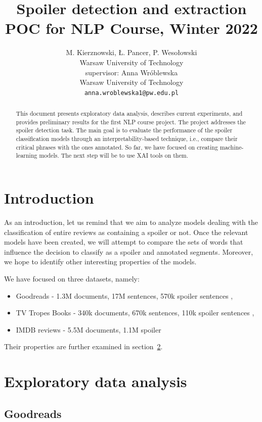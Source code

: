 \documentclass[11pt]{article}
\title{Spoiler detection and extraction\\POC for NLP Course, Winter 2022}
\author{M. Kierznowski, Ł. Pancer, P. Wesołowski \\
  Warsaw University of Technology \\
  \And
    supervisor: Anna Wróblewska \\
  Warsaw University of Technology \\
    {\tt anna.wroblewska1@pw.edu.pl}
    }
\date{}
\begin{document}
\maketitle
\begin{abstract}
This document presents exploratory data analysis, describes current experiments, and provides preliminary results for the first NLP course project. The project addresses the spoiler detection task. The main goal is to evaluate the performance of the spoiler classification models through an interpretability-based technique, i.e., compare their critical phrases with the ones annotated. So far, we have focused on creating machine-learning models. The next step will be to use XAI tools on them.

\end{abstract}

\section{Introduction}
As an introduction, let us remind that we aim to analyze models dealing with the classification of entire reviews as containing a spoiler or not. Once the relevant models have been created, we will attempt to compare the sets of words that influence the decision to classify as a spoiler and annotated segments. Moreover, we hope to identify other interesting properties of the models.

We have focused on three datasets, namely:
\begin{itemize}
    \item Goodreads - 1.3M documents, 17M sentences, 570k spoiler sentences \cite{wan2019fine},
    \item TV Tropes Books - 340k documents, 670k sentences, 110k spoiler sentences \cite{wroblewska2021spoiler},
    \item IMDB reviews - 5.5M documents, 1.1M spoiler \cite{enam_biswas_2021}
\end{itemize}
Their properties are further examined in section~\ref{eda}.

\section{Exploratory data analysis} \label{eda}


\subsection{Goodreads}
\end{document}
